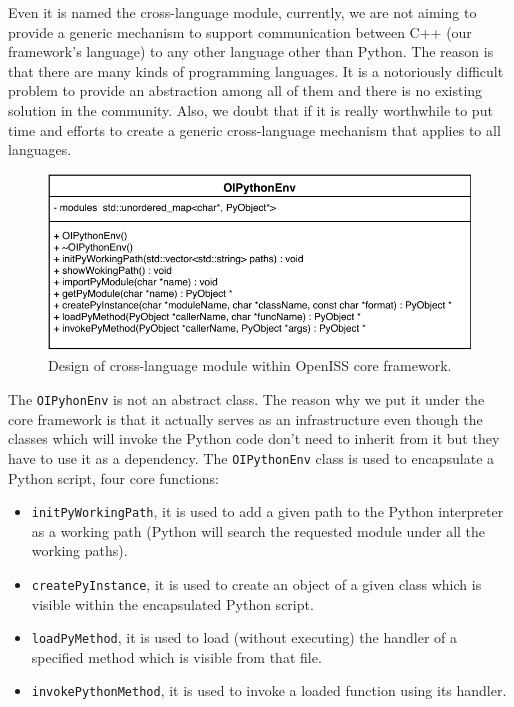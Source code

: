 Even it is named the cross-language module, 
currently, we are not aiming to provide a generic mechanism to support 
communication between C++ (our framework's language) to any other language 
other than Python. The reason is that there are many kinds of programming
languages. It is a notoriously difficult problem to provide an abstraction among all
of them and there is no existing solution in the community. 
Also, we doubt that if it is really worthwhile to put time and efforts
to create a generic cross-language mechanism that applies to all languages. 

\begin{figure}
    \centering
    \includegraphics[scale=0.8]{figures/framework_core_cross_lang.pdf}
    \caption{Design of cross-language module within OpenISS core framework.}
    \label{fig:fw-core-cross-lang}
\end{figure}

The \texttt{OIPyhonEnv} is not an abstract class.
The reason why we put it under the core framework is that it actually serves as
an infrastructure even though the classes which will invoke the Python code
don't need to inherit from it but they have to use it as a dependency.
The \texttt{OIPythonEnv} class is used to encapsulate a Python script, four
core functions:

\begin{itemize}
    \item \texttt{initPyWorkingPath}, 
    it is used to add a given path to the Python interpreter as a working path 
    (Python will search the requested module under all the working paths).
    
    \item \texttt{createPyInstance},
    it is used to create an object of a given class which is 
    visible within the encapsulated Python script.
    
    \item \texttt{loadPyMethod},
    it is used to load (without executing) the handler of a specified method
    which is visible from that file.
    
    \item \texttt{invokePythonMethod},
    it is used to invoke a loaded function using its handler.
\end{itemize}

